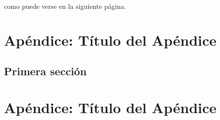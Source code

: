 \documentclass[12pt,a4paper,]{book}
\def\ifdoblecara{} %
\def\ifprincipal{} %
\numberwithin{dummy}{section}
\theoremstyle{ocrenumbox}
\theoremstyle{blacknumex}
\theoremstyle{blacknumbox}
\theoremstyle{ocrenum}
\theoremstyle{ocrenum}
\begin{document}
como puede verse en la siguiente página.



\FloatBarrier

\appendix

\ifdefined\ifprincipal
\else
\setlength{\parindent}{1em}
\pagestyle{fancy}
\setcounter{tocdepth}{4}
\tableofcontents

\fi

\ifdefined\ifdoblecara
\fancyhead{}{}
\fancyhead[LE,RO]{\scriptsize\rightmark}
\fancyfoot[LO,RE]{\scriptsize\slshape \leftmark}
\fancyfoot[C]{}
\fancyfoot[LE,RO]{\footnotesize\thepage}
\else
\fancyhead{}{}
\fancyhead[RO]{\scriptsize\rightmark}
\fancyfoot[LO]{\scriptsize\slshape \leftmark}
\fancyfoot[C]{}
\fancyfoot[RO]{\footnotesize\thepage}
\fi
\renewcommand{\headrulewidth}{0.4pt}
\renewcommand{\footrulewidth}{0.4pt}

\hypertarget{apuxe9ndice-tuxedtulo-del-apuxe9ndice}{%
\chapter{Apéndice: Título del
Apéndice}\label{apuxe9ndice-tuxedtulo-del-apuxe9ndice}}

\hypertarget{primera-secciuxf3n-4}{%
\section{Primera sección}\label{primera-secciuxf3n-4}}

\ifdefined\ifprincipal
\else
\setlength{\parindent}{1em}
\pagestyle{fancy}
\setcounter{tocdepth}{4}
\tableofcontents

\fi

\ifdefined\ifdoblecara
\fancyhead{}{}
\fancyhead[LE,RO]{\scriptsize\rightmark}
\fancyfoot[LO,RE]{\scriptsize\slshape \leftmark}
\fancyfoot[C]{}
\fancyfoot[LE,RO]{\footnotesize\thepage}
\else
\fancyhead{}{}
\fancyhead[RO]{\scriptsize\rightmark}
\fancyfoot[LO]{\scriptsize\slshape \leftmark}
\fancyfoot[C]{}
\fancyfoot[RO]{\footnotesize\thepage}
\fi
\renewcommand{\headrulewidth}{0.4pt}
\renewcommand{\footrulewidth}{0.4pt}

\hypertarget{apuxe9ndice-tuxedtulo-del-apuxe9ndice-1}{%
\chapter{Apéndice: Título del
Apéndice}\label{apuxe9ndice-tuxedtulo-del-apuxe9ndice-1}}
\end{document}

